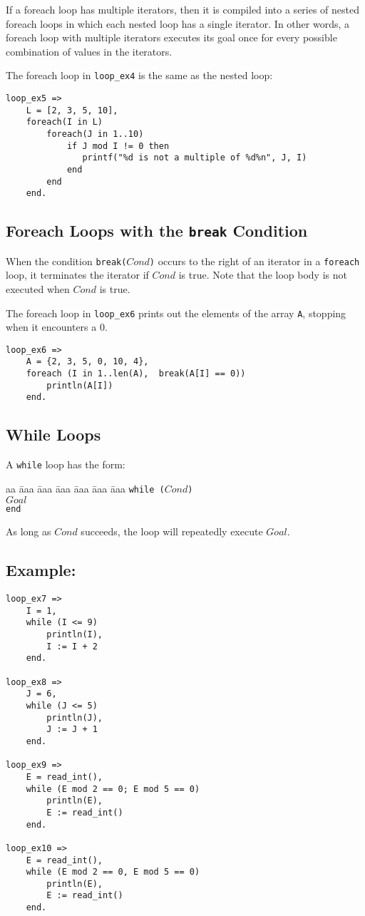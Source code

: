 If a foreach loop has multiple iterators, then it is compiled into a series of nested foreach loops in which each nested loop has a single iterator.  In other words, a foreach loop with multiple iterators executes its goal once for every possible combination of values in the iterators.

The foreach loop in \texttt{loop\_ex4} is the same as the nested loop:
\begin{verbatim}
loop_ex5 =>
    L = [2, 3, 5, 10],
    foreach(I in L)
        foreach(J in 1..10)
            if J mod I != 0 then
               printf("%d is not a multiple of %d%n", J, I)
            end
        end
    end.
\end{verbatim}

\subsection{Foreach Loops with the \texttt{break} Condition}
When the condition \texttt{break($Cond$)} occurs to the right of an iterator in a \texttt{foreach} loop, it terminates the iterator if $Cond$ is true. Note that the loop body is not executed when $Cond$ is true. 

The foreach loop in \texttt{loop\_ex6} prints out the elements of the array \texttt{A}, stopping when it encounters a 0.
\begin{verbatim}
loop_ex6 =>
    A = {2, 3, 5, 0, 10, 4},
    foreach (I in 1..len(A),  break(A[I] == 0))
        println(A[I])
    end.
\end{verbatim}


\subsection{While Loops}
A \texttt{while} loop has the form:
\begin{tabbing}
aa \= aaa \= aaa \= aaa \= aaa \= aaa \= aaa \kill
\> \texttt{while ($Cond$)} \\
\> \> $Goal$  \\
\>  \texttt{end}
\end{tabbing} 
As long as $Cond$ succeeds, the loop will repeatedly execute $Goal$.  
\subsection*{Example:}
\begin{verbatim}
loop_ex7 =>
    I = 1, 
    while (I <= 9)
        println(I),
        I := I + 2
    end.

loop_ex8 =>
    J = 6,
    while (J <= 5)
        println(J),
        J := J + 1
    end.

loop_ex9 =>
    E = read_int(),
    while (E mod 2 == 0; E mod 5 == 0)
        println(E),
        E := read_int()
    end.

loop_ex10 =>
    E = read_int(),
    while (E mod 2 == 0, E mod 5 == 0)
        println(E),
        E := read_int()
    end.
\end{verbatim}

